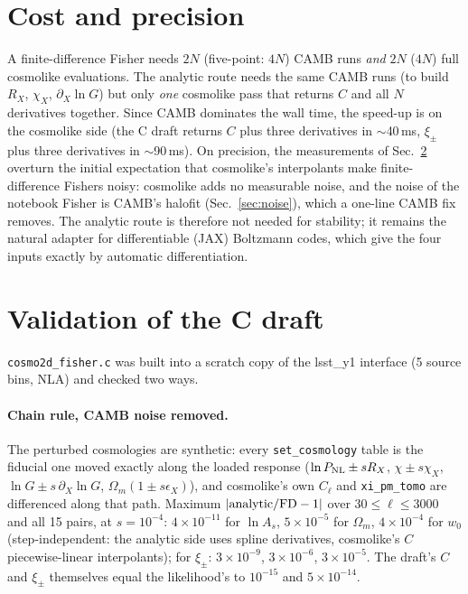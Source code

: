 \documentclass[11pt]{article}
\begin{document}
\section{Cost and precision}
A finite-difference Fisher needs $2N$ (five-point: $4N$) CAMB runs
\emph{and} $2N$ ($4N$) full cosmolike evaluations. The analytic route needs
the same CAMB runs (to build $R_X$, $\chi_X$, $\partial_X\ln G$) but only
\emph{one} cosmolike pass that returns $C$ and all $N$ derivatives together.
Since CAMB dominates the wall time, the speed-up is on the cosmolike side
(the C draft returns $C$ plus three derivatives in $\sim$40\,ms, $\xi_\pm$
plus three derivatives in $\sim$90\,ms). On precision, the measurements of
Sec.~\ref{sec:draft} overturn the initial expectation that cosmolike's
interpolants make finite-difference Fishers noisy: cosmolike adds no
measurable noise, and the noise of the notebook Fisher is CAMB's halofit
(Sec.~\ref{sec:noise}), which a one-line CAMB fix removes. The analytic
route is therefore not needed for stability; it remains the natural
adapter for differentiable (JAX) Boltzmann codes, which give the four
inputs exactly by automatic differentiation.

\section{Validation of the C draft}\label{sec:draft}
\texttt{cosmo2d\_fisher.c} was built into a scratch copy of the lsst\_y1
interface (5 source bins, NLA) and checked two ways.

\paragraph{Chain rule, CAMB noise removed.} The perturbed cosmologies are
synthetic: every \texttt{set\_cosmology} table is the fiducial one moved
exactly along the loaded response
($\ln P_{\rm NL}\pm sR_X$, $\chi\pm s\chi_X$, $\ln G\pm s\,\partial_X\ln G$,
$\Omega_m(1\pm s\epsilon_X)$), and cosmolike's own $C_\ell$ and
\texttt{xi\_pm\_tomo} are differenced along that path. Maximum
$|{\rm analytic}/{\rm FD}-1|$ over $30\le\ell\le3000$ and all 15 pairs, at
$s=10^{-4}$: $4\times10^{-11}$ for $\ln A_s$, $5\times10^{-5}$ for
$\Omega_m$, $4\times10^{-4}$ for $w_0$ (step-independent: the analytic side
uses spline derivatives, cosmolike's $C$ piecewise-linear interpolants); for
$\xi_\pm$: $3\times10^{-9}$, $3\times10^{-6}$, $3\times10^{-5}$. The draft's
$C$ and $\xi_\pm$ themselves equal the likelihood's to $10^{-15}$ and
$5\times10^{-14}$.
\end{document}
